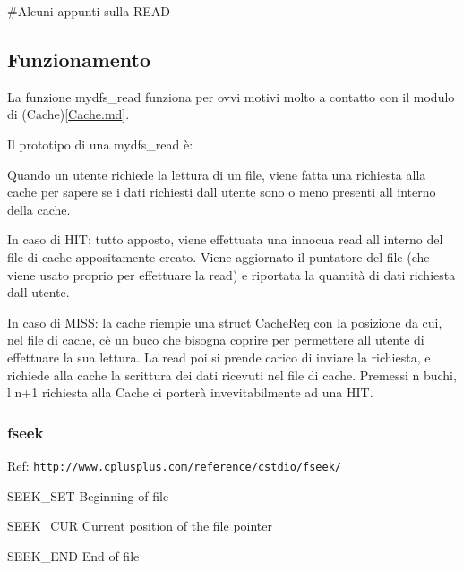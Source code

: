 \#\+Alcuni appunti sulla R\+E\+AD \subsection*{Funzionamento}

La funzione mydfs\+\_\+read funziona per ovvi motivi molto a contatto con il modulo di (Cache)\mbox{[}\hyperlink{Cache_8md}{Cache.\+md}\mbox{]}.

Il prototipo di una mydfs\+\_\+read è\+:

Quando un utente richiede la lettura di un file, viene fatta una richiesta alla cache per sapere se i dati richiesti dall\textquotesingle{} utente sono o meno presenti all\textquotesingle{} interno della cache.
\begin{DoxyItemize}
\item In caso di H\+IT\+: tutto apposto, viene effettuata una innocua read all\textquotesingle{} interno del file di cache appositamente creato. Viene aggiornato il puntatore del file (che viene usato proprio per effettuare la read) e riportata la quantità di dati richiesta dall\textquotesingle{} utente.
\item In caso di M\+I\+SS\+: la cache riempie una struct Cache\+Req con la posizione da cui, nel file di cache, c\textquotesingle{}è un buco che bisogna coprire per permettere all \textquotesingle{}utente di effettuare la sua lettura. La read poi si prende carico di inviare la richiesta, e richiede alla cache la scrittura dei dati ricevuti nel file di cache. Premessi n buchi, l\textquotesingle{} n+1 richiesta alla Cache ci porterà invevitabilmente ad una H\+IT.
\end{DoxyItemize}

\subsubsection*{fseek}

Ref\+: \href{http://www.cplusplus.com/reference/cstdio/fseek/}{\tt http\+://www.\+cplusplus.\+com/reference/cstdio/fseek/}


\begin{DoxyItemize}
\item S\+E\+E\+K\+\_\+\+S\+ET Beginning of file
\item S\+E\+E\+K\+\_\+\+C\+UR Current position of the file pointer
\item S\+E\+E\+K\+\_\+\+E\+ND End of file 
\end{DoxyItemize}